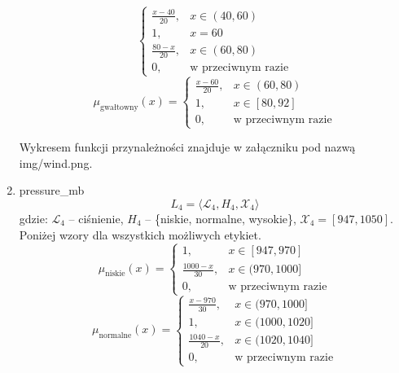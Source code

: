 \documentclass{article}
\begin{document}
\begin{enumerate}
\begin{equation}
                    \begin{cases}
                    \frac{x - 40}{20}, & x \in (40, 60) \\
                    1, & x = 60 \\
                    \frac{80 - x}{20}, & x \in (60, 80) \\
                    0, & \text{w przeciwnym razie}
                    \end{cases}
              \end{equation}
              \begin{equation}
                    \mu_{\text{gwałtowny}}(x) =
                    \begin{cases}
                    \frac{x - 60}{20}, & x \in (60, 80) \\
                    1, & x \in [80, 92] \\
                    0, & \text{w przeciwnym razie}
                    \end{cases}
              \end{equation}

Wykresem funkcji przynależności znajduje w załączniku pod nazwą img/wind.png.
              
    \item pressure\_mb
        \begin{equation}
            L_4 = \langle \mathcal{L}_4, H_4, \mathcal{X}_4 \rangle
        \end{equation}
        gdzie: $\mathcal{L}_4$ – ciśnienie, $H_4$ – \{niskie, normalne, wysokie\}, $\mathcal{X}_4 = [947, 1050]$. \\
        Poniżej wzory dla wszystkich możliwych etykiet.
                \begin{equation}
                    \mu_{\text{niskie}}(x) =
                    \begin{cases}
                    1, & x \in [947, 970] \\
                    \frac{1000 - x}{30}, & x \in (970, 1000] \\
                    0, & \text{w przeciwnym razie}
                    \end{cases}
              \end{equation}
                \begin{equation}
                   \mu_{\text{normalne}}(x) =
                    \begin{cases}
                    \frac{x - 970}{30}, & x \in (970, 1000] \\
                    1, & x \in (1000, 1020] \\
                    \frac{1040 - x}{20}, & x \in (1020, 1040] \\
                    0, & \text{w przeciwnym razie}
                    \end{cases}
                \end{equation}


\end{enumerate}
\end{document}
